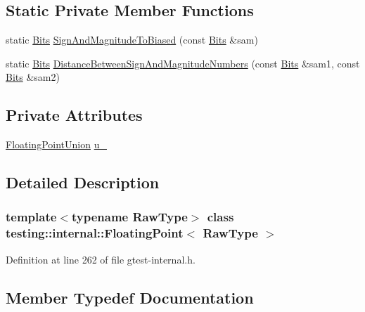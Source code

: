 \subsection*{Static Private Member Functions}
\begin{DoxyCompactItemize}
\item 
static \hyperlink{classtesting_1_1internal_1_1FloatingPoint_abf228bf6cd48f12c8b44c85b4971a731}{Bits} \hyperlink{classtesting_1_1internal_1_1FloatingPoint_a2cf0e39c6ebf026bc0353100d031ca85}{Sign\+And\+Magnitude\+To\+Biased} (const \hyperlink{classtesting_1_1internal_1_1FloatingPoint_abf228bf6cd48f12c8b44c85b4971a731}{Bits} \&sam)
\item 
static \hyperlink{classtesting_1_1internal_1_1FloatingPoint_abf228bf6cd48f12c8b44c85b4971a731}{Bits} \hyperlink{classtesting_1_1internal_1_1FloatingPoint_afe00f9f26ad2929a061f7e07b8a5071a}{Distance\+Between\+Sign\+And\+Magnitude\+Numbers} (const \hyperlink{classtesting_1_1internal_1_1FloatingPoint_abf228bf6cd48f12c8b44c85b4971a731}{Bits} \&sam1, const \hyperlink{classtesting_1_1internal_1_1FloatingPoint_abf228bf6cd48f12c8b44c85b4971a731}{Bits} \&sam2)
\end{DoxyCompactItemize}
\subsection*{Private Attributes}
\begin{DoxyCompactItemize}
\item 
\hyperlink{uniontesting_1_1internal_1_1FloatingPoint_1_1FloatingPointUnion}{Floating\+Point\+Union} \hyperlink{classtesting_1_1internal_1_1FloatingPoint_a2e0b6bd427248b91476f3fca281f7104}{u\+\_\+}
\end{DoxyCompactItemize}


\subsection{Detailed Description}
\subsubsection*{template$<$typename Raw\+Type$>$\newline
class testing\+::internal\+::\+Floating\+Point$<$ Raw\+Type $>$}



Definition at line 262 of file gtest-\/internal.\+h.



\subsection{Member Typedef Documentation}
\mbox{\label{classtesting_1_1internal_1_1FloatingPoint_abf228bf6cd48f12c8b44c85b4971a731}} 

